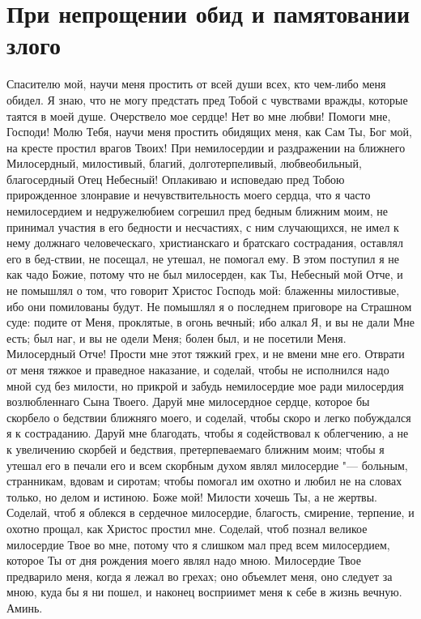 \section{При непрощении обид и памятовании злого}\begin{mymulticols}
 

Спасителю мой, научи меня простить от всей души всех, кто чем-либо меня обидел. Я знаю, что не могу предстать пред Тобой с чувствами вражды, которые таятся в моей душе. Очерствело мое сердце! Нет во мне любви! Помоги мне, Господи! Молю Тебя, научи меня простить обидящих меня, как Сам Ты, Бог мой, на кресте простил врагов Твоих! При немилосердии и раздражении на ближнего Милосердный, милостивый, благий, долготерпеливый, любвеобильный, благосердный Отец Небесный! Оплакиваю и исповедаю пред Тобою прирожденное злонравие и нечувствительность моего сердца, что я часто немилосердием и недружелюбием согрешил пред бедным ближним моим, не принимал участия в его бедности и несчастиях, с ним случающихся, не имел к нему должнаго человеческаго, христианскаго и братскаго сострадания, оставлял его в бед-ствии, не посещал, не утешал, не помогал ему. В этом поступил я не как чадо Божие, потому что не был милосерден, как Ты, Небесный мой Отче, и не помышлял о том, что говорит Христос Господь мой: блаженны милостивые, ибо они помилованы будут. Не помышлял я о последнем приговоре на Страшном суде: подите от Меня, проклятые, в огонь вечный; ибо алкал Я, и вы не дали Мне есть; был наг, и вы не одели Меня; болен был, и не посетили Меня. Милосердный Отче! Прости мне этот тяжкий грех, и не вмени мне его. Отврати от меня тяжкое и праведное наказание, и соделай, чтобы не исполнился надо мной суд без милости, но прикрой и забудь немилосердие мое ради милосердия возлюбленнаго Сына Твоего. Даруй мне милосердное сердце, которое бы скорбело о бедствии ближняго моего, и соделай, чтобы скоро и легко побуждался я к состраданию. Даруй мне благодать, чтобы я содействовал к облегчению, а не к увеличению скорбей и бедствия, претерпеваемаго ближним моим; чтобы я утешал его в печали его и всем скорбным духом являл милосердие "--- больным, странникам, вдовам и сиротам; чтобы помогал им охотно и любил не на словах только, но делом и истиною. Боже мой! Милости хочешь Ты, а не жертвы. Соделай, чтоб я облекся в сердечное милосердие, благость, смирение, терпение, и охотно прощал, как Христос простил мне. Соделай, чтоб познал великое милосердие Твое во мне, потому что я слишком мал пред всем милосердием, которое Ты от дня рождения моего являл надо мною. Милосердие Твое предварило меня, когда я лежал во грехах; оно объемлет меня, оно следует за мною, куда бы я ни пошел, и наконец восприимет меня к себе в жизнь вечную. Аминь. 

\end{mymulticols}

